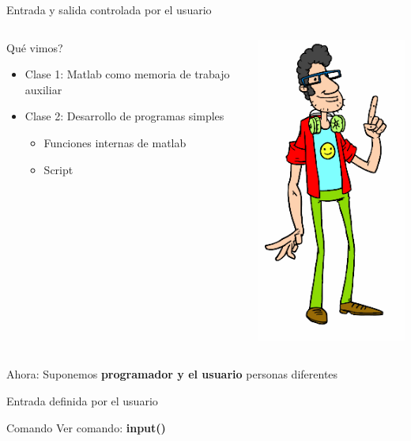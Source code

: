 \documentclass{bredelebeamer}
\begin{document}
\begin{frame}{Entrada y salida controlada por el usuario}
\begin{columns}
\begin{column}{0.5\textwidth}
Qué vimos?
\begin{itemize}
\item Clase 1: Matlab como memoria de trabajo auxiliar
\item Clase 2: Desarrollo de programas simples
\begin{itemize}
\item Funciones internas de matlab
\item Script
\end{itemize}
\end{itemize}
\end{column}
\begin{column}{0.5\textwidth}
\begin{center}
\includegraphics[scale=0.3]{images/img42.png}
\end{center}
\end{column}
\end{columns}
\begin{center}
Ahora: Suponemos \textbf{programador y el usuario} personas diferentes
\end{center}
\end{frame}

\begin{frame}{Entrada definida por el usuario}
\begin{exampleblock}{Comando}
Ver comando: \textbf{input()}
\end{exampleblock}
\end{frame}
\end{document}
